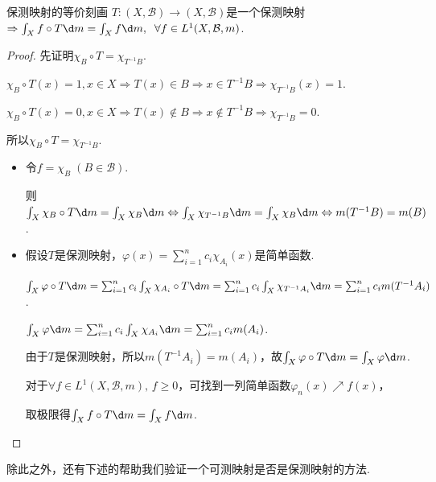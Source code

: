 \begin{proposition}{保测映射的等价刻画}
    $T:(X,\mathcal{B}) \to (X,\mathcal{B})$是一个保测映射$\Rightarrow \int_X{f\circ T}\d m=\int_X{f}\d m, \;\; \forall f\in L^1(X,\mathcal{B},m)$.
\end{proposition}
\begin{proof}
    先证明$\chi_B\circ T=\chi_{T^{-1}B}$.\par
    $\chi_B\circ T(x)=1,x\in X \Rightarrow T(x)\in B \Rightarrow x\in T^{-1}B \Rightarrow \chi_{T^{-1}B}(x)=1$. \par
    $\chi_B\circ T(x)=0,x\in X \Rightarrow T(x)\notin B \Rightarrow x\notin T^{-1}B \Rightarrow \chi_{T^{-1}B}=0$.\par
    所以$\chi_B\circ T=\chi_{T^{-1}B}$.\par
    \begin{itemize}[leftmargin=3.5em]
        \item[“$\Leftarrow$”] 令$f=\chi_B\;(B\in\mathcal{B})$.\par
        则$\int_X{\chi_B\circ T}\d m=\int_X{\chi_B}\d m \Leftrightarrow \int_X{\chi_{T^{-1}B}}\d m=\int_X{\chi_B}\d m \Leftrightarrow m(T^{-1}B)=m(B)$.\par
        \item[“$\Rightarrow$”] 假设$T$是保测映射，$\varphi(x)=\sum_{i=1}^n{c_i\chi_{A_i}(x)}$是简单函数.\par
        $\int_X{\varphi\circ T}\d m = \sum_{i=1}^n{c_i\int_X{\chi_{A_i}\circ T}\d m} = \sum_{i=1}^n{c_i\int_X{\chi_{T^{-1}A_i}}\d m} = \sum_{i=1}^n{c_i m(T^{-1}A_i)}$.\par
        $\int_X{\varphi}\d m=\sum_{i=1}^n{c_i\int_X{\chi_{A_i}}\d m} =\sum_{i=1}^n{c_i m(A_i)}$.\par
        由于$T$是保测映射，所以$m(T^{-1}A_i)=m(A_i)$，故$\int_X{\varphi\circ T}\d m=\int_X{\varphi}\d m$.\par
        对于$\forall f\in L^1(X,\mathcal{B},m),\, f\geq 0$，可找到一列简单函数$\varphi_n(x)\nearrow f(x)$，\par
        取极限得$\int_X{f\circ T}\d m=\int_X{f}\d m$.
    \end{itemize}
\end{proof}

除此之外，还有下述的帮助我们验证一个可测映射是否是保测映射的方法.

